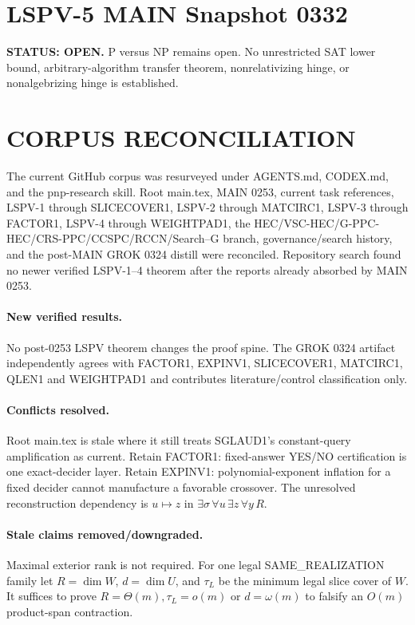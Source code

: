 \documentclass[11pt]{article}
\begin{document}
\section*{LSPV-5 MAIN Snapshot 0332}
\textbf{STATUS: OPEN.} P versus NP remains open. No unrestricted SAT lower bound, arbitrary-algorithm transfer theorem, nonrelativizing hinge, or nonalgebrizing hinge is established.

\section*{CORPUS RECONCILIATION}
The current GitHub corpus was resurveyed under AGENTS.md, CODEX.md, and the pnp-research skill. Root main.tex, MAIN 0253, current task references, LSPV-1 through SLICECOVER1, LSPV-2 through MATCIRC1, LSPV-3 through FACTOR1, LSPV-4 through WEIGHTPAD1, the HEC/VSC-HEC/G-PPC-HEC/CRS-PPC/CCSPC/RCCN/Search--G branch, governance/search history, and the post-MAIN GROK 0324 distill were reconciled. Repository search found no newer verified LSPV-1--4 theorem after the reports already absorbed by MAIN 0253.

\paragraph{New verified results.} No post-0253 LSPV theorem changes the proof spine. The GROK 0324 artifact independently agrees with FACTOR1, EXPINV1, SLICECOVER1, MATCIRC1, QLEN1 and WEIGHTPAD1 and contributes literature/control classification only.

\paragraph{Conflicts resolved.} Root main.tex is stale where it still treats SGLAUD1's constant-query amplification as current. Retain FACTOR1: fixed-answer YES/NO certification is one exact-decider layer. Retain EXPINV1: polynomial-exponent inflation for a fixed decider cannot manufacture a favorable crossover. The unresolved reconstruction dependency is \(u\mapsto z\) in \(\exists\sigma\,\forall u\,\exists z\,\forall y\,R\).

\paragraph{Stale claims removed/downgraded.} Maximal exterior rank is not required. For one legal SAME\_REALIZATION family let \(R=\dim W\), \(d=\dim U\), and \(\tau_L\) be the minimum legal slice cover of \(W\). It suffices to prove \(R=\Theta(m),\tau_L=o(m)\) or \(d=\omega(m)\) to falsify an \(O(m)\) product-span contraction.
\end{document}
